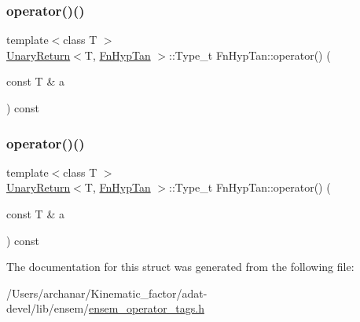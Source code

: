 \mbox{\label{structFnHypTan_a549867ce795e58e29cc5c574347de91b}} 
\subsubsection{\texorpdfstring{operator()()}{operator()()}\hspace{0.1cm}{\footnotesize\ttfamily [2/3]}}
{\footnotesize\ttfamily template$<$class T $>$ \\
\mbox{\hyperlink{structUnaryReturn}{Unary\+Return}}$<$T, \mbox{\hyperlink{structFnHypTan}{Fn\+Hyp\+Tan}} $>$\+::Type\+\_\+t Fn\+Hyp\+Tan\+::operator() (\begin{DoxyParamCaption}\item[{const T \&}]{a }\end{DoxyParamCaption}) const\hspace{0.3cm}{\ttfamily [inline]}}

\mbox{\label{structFnHypTan_a549867ce795e58e29cc5c574347de91b}} 
\subsubsection{\texorpdfstring{operator()()}{operator()()}\hspace{0.1cm}{\footnotesize\ttfamily [3/3]}}
{\footnotesize\ttfamily template$<$class T $>$ \\
\mbox{\hyperlink{structUnaryReturn}{Unary\+Return}}$<$T, \mbox{\hyperlink{structFnHypTan}{Fn\+Hyp\+Tan}} $>$\+::Type\+\_\+t Fn\+Hyp\+Tan\+::operator() (\begin{DoxyParamCaption}\item[{const T \&}]{a }\end{DoxyParamCaption}) const\hspace{0.3cm}{\ttfamily [inline]}}



The documentation for this struct was generated from the following file\+:\begin{DoxyCompactItemize}
\item 
/\+Users/archanar/\+Kinematic\+\_\+factor/adat-\/devel/lib/ensem/\mbox{\hyperlink{adat-devel_2lib_2ensem_2ensem__operator__tags_8h}{ensem\+\_\+operator\+\_\+tags.\+h}}\end{DoxyCompactItemize}
